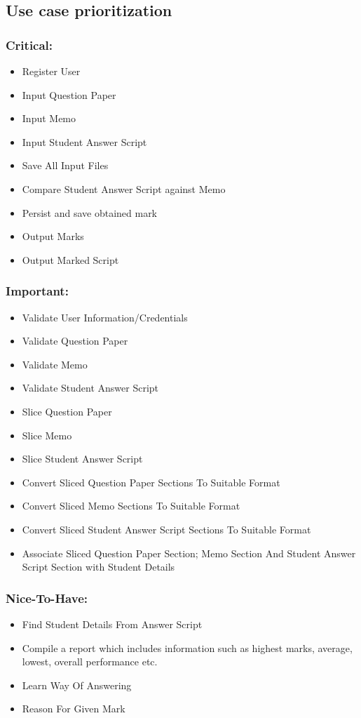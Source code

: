 \documentclass{article}
\begin{document}
	\subsection{Use case prioritization}

		\subsubsection{Critical:}
			\begin{itemize}
				\item Register User
				\item Input Question Paper
				\item Input Memo
				\item Input Student Answer Script
				\item Save All Input Files
				\item Compare Student Answer Script against Memo
				\item Persist and save obtained mark
				\item Output Marks
				\item Output Marked Script
			\end{itemize}
		\subsubsection{Important:}
			\begin{itemize}
				\item Validate User Information/Credentials
				\item Validate Question Paper
				\item Validate Memo
				\item Validate Student Answer Script
				\item Slice Question Paper
				\item Slice Memo
				\item Slice Student Answer Script
				\item Convert Sliced Question Paper Sections To Suitable Format
				\item Convert Sliced Memo Sections To Suitable Format
				\item Convert Sliced Student Answer Script Sections To Suitable Format
				\item Associate Sliced Question Paper Section; Memo Section And Student Answer Script Section with Student Details
				
			\end{itemize}
		\subsubsection{Nice-To-Have:}
			\begin{itemize}
				\item Find Student Details From Answer Script
				\item Compile a report which includes information such as highest marks, average, lowest, overall performance etc.
				\item Learn Way Of Answering
				\item Reason For Given Mark
			
			\end{itemize}
\end{document}
